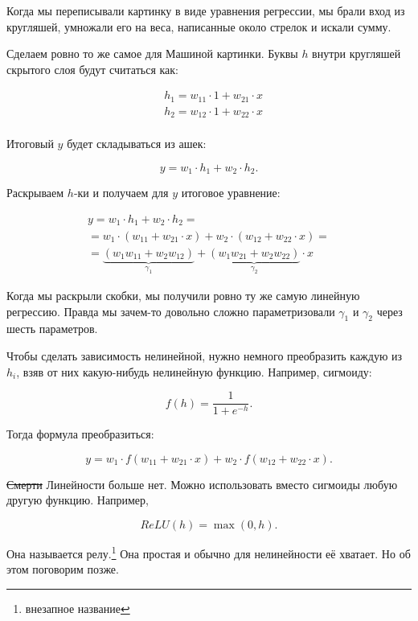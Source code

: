 \begin{sol}
Когда мы переписывали картинку в виде уравнения регрессии, мы брали вход из кругляшей, умножали его на веса, написанные около стрелок и искали сумму. 

Сделаем ровно то же самое для Машиной картинки. Буквы $h$ внутри кругляшей скрытого слоя будут считаться как: 

\begin{equation*}
    \begin{aligned} 
    & h_1 = w_{11} \cdot 1 + w_{21} \cdot x \\
    & h_2 = w_{12} \cdot 1 + w_{22} \cdot x \\
    \end{aligned} 
\end{equation*}

Итоговый $y$ будет складываться из ашек: 

$$
y = w_1 \cdot h_1 + w_2 \cdot h_2.
$$

Раскрываем $h$-ки и получаем для $y$ итоговое уравнение: 

\begin{multline*} 
y = w_1 \cdot h_1 + w_2 \cdot h_2 = \\ = w_1 \cdot (w_{11} + w_{21} \cdot x)  + w_2 \cdot (w_{12} + w_{22} \cdot x)  = \\ = \underbrace{(w_1 w_{11} + w_2 w_{12})}_{\gamma_1} + \underbrace{(w_1 w_{21} + w_2 w_{22})}_{\gamma_2} \cdot x 
\end{multline*} 

Когда мы раскрыли скобки, мы получили ровно ту же самую линейную регрессию. Правда мы зачем-то довольно сложно параметризовали $\gamma_1$ и $\gamma_2$ через шесть параметров.

Чтобы сделать зависимость нелинейной, нужно немного преобразить каждую из $h_i$, взяв от них какую-нибудь нелинейную функцию. Например, сигмоиду: 

$$
f(h) = \frac{1}{1 + e^{-h}}.
$$

Тогда формула преобразиться: 

$$
y = w_1 \cdot f(w_{11} + w_{21} \cdot x)  + w_2 \cdot f(w_{12} + w_{22} \cdot x).
$$

\sout{Смерти} Линейности больше нет.  Можно использовать вместо сигмоиды любую другую функцию. Например, 

$$
ReLU(h) = \max(0, h).
$$

Она называется релу.\footnote{внезапное название} Она простая и обычно для нелинейности её хватает. Но об этом поговорим позже. 
\end{sol} 


